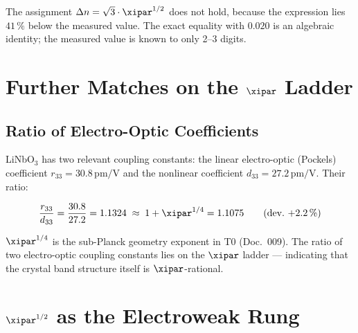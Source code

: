 \medskip
The assignment $\Delta n = \sqrt{3}\cdot\xipar^{1/2}$ does not hold, because the
expression lies $41\,\%$ below the measured value. The exact equality with $0.020$
is an algebraic identity; the measured value is known to only 2--3 digits.

\clearpage

\section{Further Matches on the \texorpdfstring{$\xipar$}{xi} Ladder}
\label{sec:further}

\subsection{Ratio of Electro-Optic Coefficients}

LiNbO$_3$ has two relevant coupling constants: the linear electro-optic
(Pockels) coefficient $r_{33} = 30.8\,\text{pm/V}$ and the nonlinear
coefficient $d_{33} = 27.2\,\text{pm/V}$.  Their ratio:

\begin{equation}
    \frac{r_{33}}{d_{33}} = \frac{30.8}{27.2} = 1.1324
    \;\approx\; 1 + \xipar^{1/4} = 1.1075
    \qquad (\text{dev.}\ {+}2.2\,\%)
\end{equation}

$\xipar^{1/4}$ is the sub-Planck geometry exponent in T0 (Doc.~009).
The ratio of two electro-optic coupling constants lies on the $\xipar$
ladder — indicating that the crystal band structure itself is
$\xipar$-rational.

\clearpage

\section{\texorpdfstring{$\xipar^{1/2}$}{xi\^{}(1/2)} as the Electroweak Rung}
\label{sec:classification}

